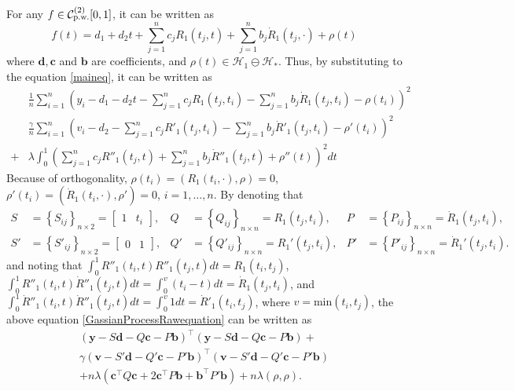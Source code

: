 For any $f\in\mathcal{C}_{\mbox{\scriptsize p.w.}}^{(2)}[0,1]$, it can be written as 
\begin{equation}\label{GaussianProcessFunctionF}
f(t)=d_1+d_2t+\sum_{j=1}^{n}c_jR_1(t_j,t)+\sum_{j=1}^{n}b_j\dot{R}_1(t_j,\cdot) +\rho(t)
\end{equation}
where $\mathbf{d},\mathbf{c}$ and $\mathbf{b}$ are coefficients, and $\rho(t) \in \mathcal{H}_1 \ominus \mathcal{H}_*$. Thus, by substituting to the equation \eqref{maineq}, it can be written as 
\begin{equation}\label{GassianProcessRawequation}
\begin{split}
&\frac{1}{n}\sum_{i=1}^n \left( y_i - d_1-d_2t-\sum_{j=1}^{n}c_jR_1(t_j,t_i)-\sum_{j=1}^{n}b_j\dot{R}_1(t_j,t_i)-\rho(t_i) \right) ^2\\
&\frac{\gamma}{n}\sum_{i=1}^n \left( v_i - d_2-\sum_{j=1}^{n}c_jR'_1(t_j,t_i)-\sum_{j=1}^{n}b_j\dot{R}'_1(t_j,t_i)-\rho'(t_i) \right) ^2\\
+&\lambda \int_0^1 \left( \sum_{j=1}^{n}c_jR''_1(t_j,t)+\sum_{j=1}^{n}b_j\dot{R}''_1(t_j,t)+\rho''(t)\right)^2dt
\end{split}
\end{equation}
Because of orthogonality, $\rho(t_i) = \left(R_1(t_i,\cdot),\rho\right)=0$, $\rho'(t_i) = \left(\dot{R}_1(t_i,\cdot),\rho'\right)=0$, $i=1,\ldots,n$. By denoting that 
\begin{align*}
S&=\left\lbrace S_{ij} \right\rbrace_{n\times 2}=\begin{bmatrix}1 & t_i \end{bmatrix} ,& Q&=\left\lbrace Q_{ij} \right\rbrace_{n\times n}= R_1(t_j,t_i), & P&=\left\lbrace P_{ij} \right\rbrace_{n\times n}= \dot{R}_1(t_j,t_i), \\
S'&=\left\lbrace S'_{ij} \right\rbrace_{n\times 2}=\begin{bmatrix} 0 & 1 \end{bmatrix} ,& Q'&=\left\lbrace Q'_{ij} \right\rbrace_{n\times n}= R_1'(t_j,t_i), & P'&=\left\lbrace P'_{ij} \right\rbrace_{n\times n}= \dot{R}_1'(t_j,t_i). 
\end{align*}
and noting that $\int_0^1R''_1(t_i,t)R''_1(t_j,t)dt=R_1(t_i,t_j)$, $\int_0^1R''_1(t_i,t)\dot{R}''_1(t_j,t)dt=\int_0^{v}(t_i-t)dt=\dot{R}_1(t_j,t_i)$, and $\int_0^1\dot{R}''_1(t_i,t)\dot{R}''_1(t_j,t)dt=\int_0^{v}1dt=\dot{R}'_1(t_i,t_j)$, where $v=\mbox{min}(t_i,t_j)$, the above equation \eqref{GassianProcessRawequation} can be written as 
\begin{equation}\label{matriteq}
\begin{split}
\left(\mathbf{y}-S\mathbf{d}-Q\mathbf{c}-P\mathbf{b}\right)^\top \left(\mathbf{y}-S\mathbf{d}-Q\mathbf{c}-P\mathbf{b}\right)+\\
\gamma\left(\mathbf{v}-S'\mathbf{d}-Q'\mathbf{c}-P'\mathbf{b}\right)^\top \left(\mathbf{v}-S'\mathbf{d}-Q'\mathbf{c}-P'\mathbf{b}\right)\\
+n\lambda \left(\mathbf{c}^\top Q\mathbf{c} + 2\mathbf{c}^\top P\mathbf{b}+ \mathbf{b}^\top P'\mathbf{b}\right)+n\lambda\left(\rho,\rho\right).
\end{split}
\end{equation}
